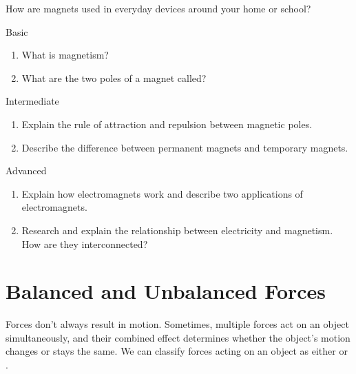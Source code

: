 \begin{stopandthink}
How are magnets used in everyday devices around your home or school?
\end{stopandthink}

\begin{tieredquestions}{Basic}
\begin{enumerate}
    \item What is magnetism?
    \item What are the two poles of a magnet called?
\end{enumerate}
\end{tieredquestions}

\begin{tieredquestions}{Intermediate}
\begin{enumerate}
    \item Explain the rule of attraction and repulsion between magnetic poles.
    \item Describe the difference between permanent magnets and temporary magnets.
\end{enumerate}
\end{tieredquestions}

\begin{tieredquestions}{Advanced}
\begin{enumerate}
    \item  Explain how electromagnets work and describe two applications of electromagnets.
    \item  Research and explain the relationship between electricity and magnetism. How are they interconnected?
\end{enumerate}
\end{tieredquestions}


\section{Balanced and Unbalanced Forces}

\begin{marginnote}
\end{marginnote}
Forces don't always result in motion. Sometimes, multiple forces act on an object simultaneously, and their combined effect determines whether the object's motion changes or stays the same.  We can classify forces acting on an object as either  or .

